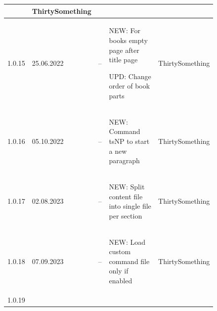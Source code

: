 \begin{tiny}
\begin{longtable}{ | p{0.06\linewidth} | p{0.08\linewidth} | p{0.06\linewidth} | p{0.49\linewidth} | p{0.15\linewidth} | }
\begin{tsLTItemize}
        \end{tsLTItemize}
                                 &
        ThirtySomething            \\
        \hline
        1.0.15                   &
        25.06.2022               &
        --                       &
        \begin{tsLTItemize}
            \item NEW: For books empty page after title page
            \item UPD: Change order of book parts
        \end{tsLTItemize}
                                 &
        ThirtySomething            \\
        \hline
        1.0.16                   &
        05.10.2022               &
        --                       &
        \begin{tsLTItemize}
            \item NEW: Command tsNP to start a new paragraph
        \end{tsLTItemize}
                                 &
        ThirtySomething            \\
        \hline
        1.0.17                   &
        02.08.2023               &
        --                       &
        \begin{tsLTItemize}
            \item NEW: Split content file into single file per section
        \end{tsLTItemize}
                                 &
        ThirtySomething            \\
        \hline
        1.0.18                   &
        07.09.2023               &
        --                       &
        \begin{tsLTItemize}
            \item NEW: Load custom command file only if enabled
        \end{tsLTItemize}
                                 &
        ThirtySomething            \\
        \hline
        1.0.19                   &

\end{longtable}
\end{tiny}
